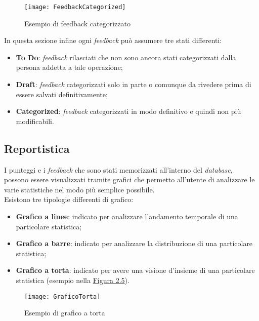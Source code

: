 \begin{figure}[h!]
\begin{center}
\texttt{[image: FeedbackCategorized]}
\caption{Esempio di feedback categorizzato}
\label{Categorization}
\end{center}
\end{figure}
\FloatBarrier

In questa sezione infine ogni \textit{feedback} può assumere tre stati differenti:
\begin{itemize}
\item \textbf{To Do}: \textit{feedback} rilasciati che non sono ancora stati categorizzati dalla persona addetta a tale operazione;
\item \textbf{Draft}: \textit{feedback} categorizzati solo in parte o comunque da rivedere prima di essere salvati definitivamente;
\item \textbf{Categorized}: \textit{feedback} categorizzati in modo definitivo e quindi non più modificabili.
\end{itemize}

\subsection{Reportistica}
\label{reporting tool}
I punteggi e i \textit{feedback} che sono stati memorizzati all'interno del \textit{database}, possono essere visualizzati tramite grafici che permetto all'utente di analizzare le varie statistiche nel modo più semplice possibile. \\
Esistono tre tipologie differenti di grafico:
\begin{itemize}
\item \textbf{Grafico a linee}: indicato per analizzare l'andamento temporale di una particolare statistica;
\item \textbf{Grafico a barre}: indicato per analizzare la distribuzione di una particolare statistica;
\item \textbf{Grafico a torta}: indicato per avere una visione d'insieme di una particolare statistica (esempio nella \hyperref[torta]{Figura 2.5}).
\end{itemize}

\begin{figure}[h!]
\begin{center}
\texttt{[image: GraficoTorta]}
\caption{Esempio di grafico a torta}
\label{torta}
\end{center}
\end{figure}
\FloatBarrier


